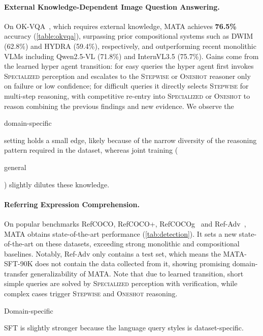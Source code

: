 \documentclass{article} %
\DeclareRobustCommand{\legendbg}[2]{%
\unskip
  \begingroup\setlength{\fboxsep}{0pt}
  \colorbox{#1}{\strut #2}%
  \endgroup
}
\DeclareRobustCommand{\legendbgp}[2]{%
\unskip
  \begingroup\setlength{\fboxsep}{0pt}
  (\colorbox{#1}{\strut #2})
  \endgroup
\ignorespaces
}
\newcommand{\revise}[1]{{#1}}
\newcommand{\methodname}{MATA}
\newcommand{\datasetname}{\methodname-SFT-90K}
\begin{document}
\paragraph{External Knowledge-Dependent Image Question Answering.} On OK-VQA~\citep{marino_ok-vqa_2019}, which requires external knowledge, \methodname{} achieves \textbf{76.5\%} accuracy (\autoref{table:okvqa}), surpassing prior compositional systems such as DWIM (62.8\%) and HYDRA (59.4\%), respectively, and outperforming recent monolithic VLMs including Qwen2.5-VL (71.8\%) and InternVL3.5 (75.7\%). Gains come from the learned hyper agent transition: for easy queries the hyper agent first invokes \textsc{Specialized} perception and escalates to the \textsc{Stepwise} or \textsc{Oneshot} reasoner only on failure or low confidence; for difficult queries it directly selects \textsc{Stepwise} for multi-step reasoning, with competitive re-entry into \textsc{Specialized} or \textsc{Oneshot} to reason combining the previous findings and new evidence. We observe the \legendbg{green!20}{domain-specific} setting holds a small edge, likely because of the narrow diversity of the reasoning pattern required in the dataset, whereas joint training \legendbgp{blue!15}{general} slightly dilutes these knowledge.

\paragraph{Referring Expression Comprehension.} On popular benchmarks RefCOCO, RefCOCO+, RefCOCOg~\citep{kazemzadeh_referitgame_2014} and Ref-Adv~\citep{akula_words_2020}, \methodname{} obtains state-of-the-art performance (\autoref{tab:detection}). It sets a new state-of-the-art on these datasets, exceeding strong monolithic and compositional baselines. Notably, Ref-Adv only contains a test set, which means the \datasetname{} does not contain the data collected from it, showing promising \revise{domain-transfer} generalizability of \methodname{}. Note that due to learned transition, short simple queries are solved by \textsc{Specialized} perception with verification, while complex cases trigger \textsc{Stepwise} and \textsc{Oneshot} reasoning. \legendbg{green!20}{Domain-specific} SFT is slightly stronger because the language query styles is dataset-specific.
\end{document}
